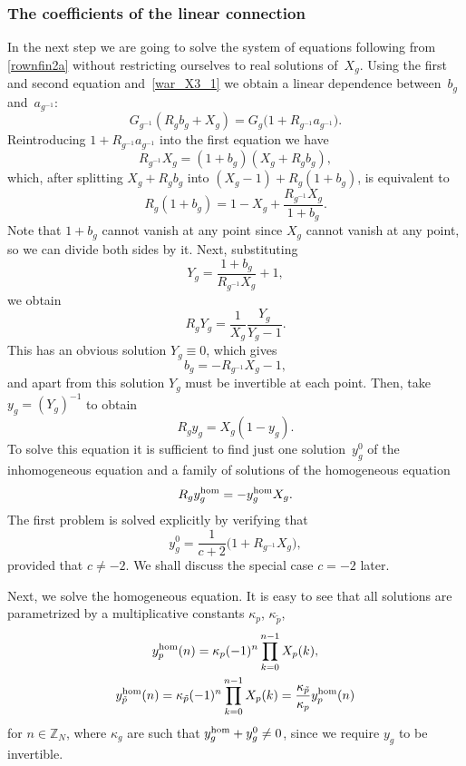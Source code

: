 \documentclass[pdftex]{sigma}
\numberwithin{equation}{section}
\newcommand{\ip}{{\tilde{p}}}
\begin{document}
\subsubsection{The coefficients of the linear connection}
In the next step we are going to solve the system of equations following from
\eqref{rownfin2a} without restricting ourselves to real solutions of~$X_g$.
Using the first and second equation and~\eqref{war_X3_1} we
obtain a linear dependence between~$b_g$ and~$a_{g^{-1}}$:
\begin{equation*}
G_{g^{-1}} ( R_g b_g + X_g ) = G_g \big( 1 + R_{g^{-1}} a_{g^{-1}} \big) .
\end{equation*}
Reintroducing $1 + R_{g^{-1}} a_{g^{-1}}$ into the first equation we have
\begin{equation}\label{iksy_b}
R_{g^{-1}} X_g = (1+b_g)(X_g +R_g b_g),
\end{equation}
which, after splitting $X_g +R_g b_g$ into $(X_g - 1) + R_g(1 + b_g)$, is equivalent to
\[
R_g(1+b_g)=1 - X_g + \frac{R_{g^{-1}}X_g}{1+b_g}.
\]
Note that $1+b_g$ cannot vanish at any point since $X_g$ cannot vanish at any point, so we can divide both
sides by it. Next, substituting
\[ Y_g = \frac{1+ b_g}{R_{g^{-1}}X_g} +1, \]
we obtain
\[
R_g Y_g = \frac{1}{X_g} \frac{Y_g}{Y_g-1}.
\]
This has an obvious solution $Y_g \equiv 0$, which gives
\[
b_g = - R_{g^{-1}}X_g -1,
\]
and apart from this solution $Y_g$ must be invertible at each point. Then, take
$y_g = (Y_g)^{-1}$ to obtain
\[ R_g y_g =X_{g} (1-y_g ). \]
To solve this equation it is sufficient to find just one solution~$y_g^0$ of the inhomogeneous equation
and a family of solutions of the homogeneous equation
\[
R_g y_g^{{\rm hom}} = - y_g^{{\rm hom}} X_{g}.
\]
The first problem is solved explicitly by verifying that
\[
y_g^0 = \frac{1}{c+2}\big(1+R_{g^{-1}}X_g\big),
\]
provided that $c\neq -2$. We shall discuss the special case $c=-2$ later.

Next, we solve the homogeneous equation. It is easy to see that all solutions are parametrized by a multiplicative constants $\kappa_p$, $\kappa_{\ip}$,
\begin{gather}
y_p^{{\rm hom}}(n) = \kappa_p (-1)^n \prod_{k=0}^{n-1} X_p(k),\label{yhom}\\
y_{\ip}^{{\rm hom}}(n) = \kappa_{\ip} (-1)^n \prod_{k=0}^{n-1} X_p(k) = \frac{\kappa_{\ip}}{\kappa_{p}} y_p^{{\rm hom}}(n)\nonumber
\end{gather}
for $n \in \mathbb{Z}_N$, where $\kappa_g$ are such that $y_g^{\rm hom}+y_g^0\neq 0$, since we require $y_g$ to be invertible.
\end{document}
